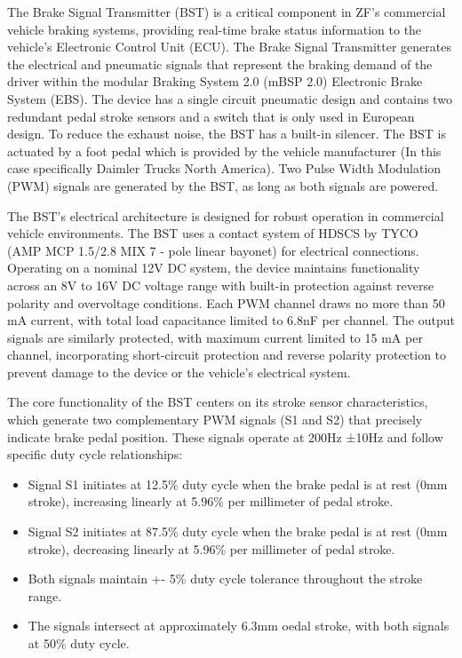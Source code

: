 \documentclass[12pt]{article}
\begin{document}
The Brake Signal Transmitter (BST) is a critical component in ZF's commercial
vehicle braking systems, providing real-time brake status information to the
vehicle's Electronic Control Unit (ECU). The Brake Signal Transmitter generates
the electrical and pneumatic signals that represent the braking demand of the
driver within the modular Braking System 2.0 (mBSP 2.0) Electronic Brake System
(EBS). The device has a single circuit pneumatic design and contains two
redundant pedal stroke sensors and a switch that is only used in European
design. To reduce the exhaust noise, the BST has a built-in silencer. The BST
is actuated by a foot pedal which is provided by the vehicle manufacturer (In
this case specifically Daimler Trucks North America). Two Pulse Width
Modulation (PWM) signals are generated by the BST, as long as both signals are
powered.

The BST's electrical architecture is designed for robust operation in
commercial vehicle environments. The BST uses a contact system of HDSCS by TYCO
(AMP MCP 1.5/2.8 MIX 7 - pole linear bayonet) for electrical connections.
Operating on a nominal 12V DC system, the device maintains functionality across
an 8V to 16V DC voltage range with built-in protection against reverse polarity
and overvoltage conditions. Each PWM channel draws no more than 50 mA current,
with total load capacitance limited to 6.8nF per channel. The output signals
are similarly protected, with maximum current limited to 15 mA per channel,
incorporating short-circuit protection and reverse polarity protection to
prevent damage to the device or the vehicle's electrical system.

The core functionality of the BST centers on its stroke sensor characteristics,
which generate two complementary PWM signals (S1 and S2) that precisely
indicate brake pedal position. These signals operate at 200Hz ±10Hz and follow
specific duty cycle relationships:

\begin{itemize} \item Signal S1 initiates at 12.5\% duty cycle when the brake
      pedal is at rest (0mm stroke), increasing linearly at 5.96\% per
    millimeter of pedal stroke. \item Signal S2 initiates at 87.5\% duty cycle
      when the brake pedal is at rest (0mm stroke), decreasing linearly at
      5.96\% per millimeter of pedal stroke. \item Both signals maintain +- 5\%
    duty cycle tolerance throughout the stroke range. \item The signals
      intersect at approximately 6.3mm oedal stroke, with both signals at 50\%
duty cycle. \end{itemize}
\end{document}
